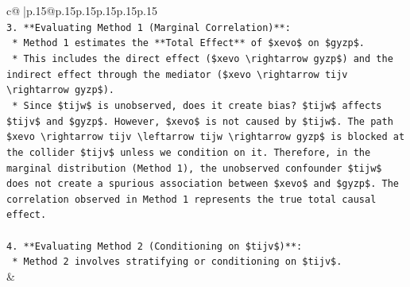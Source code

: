 \documentclass{article}
\begin{document}
{\begin{supertabular}{c@{$\;$}|p{.15\linewidth}@{}p{.15\linewidth}p{.15\linewidth}p{.15\linewidth}p{.15\linewidth}p{.15\linewidth}}
{{{\\ 
\texttt{3.  **Evaluating Method 1 (Marginal Correlation)**:} \\
\texttt{    *   Method 1 estimates the **Total Effect** of \$xevo\$ on \$gyzp\$.} \\
\texttt{    *   This includes the direct effect (\$xevo \textbackslash{}rightarrow gyzp\$) and the indirect effect through the mediator (\$xevo \textbackslash{}rightarrow tijv \textbackslash{}rightarrow gyzp\$).} \\
\texttt{    *   Since \$tijw\$ is unobserved, does it create bias? \$tijw\$ affects \$tijv\$ and \$gyzp\$. However, \$xevo\$ is not caused by \$tijw\$. The path \$xevo \textbackslash{}rightarrow tijv \textbackslash{}leftarrow tijw \textbackslash{}rightarrow gyzp\$ is blocked at the collider \$tijv\$ unless we condition on it. Therefore, in the marginal distribution (Method 1), the unobserved confounder \$tijw\$ does not create a spurious association between \$xevo\$ and \$gyzp\$. The correlation observed in Method 1 represents the true total causal effect.} \\
\\ 
\texttt{4.  **Evaluating Method 2 (Conditioning on \$tijv\$)**:} \\
\texttt{    *   Method 2 involves stratifying or conditioning on \$tijv\$.} \\
            }
        }
    }
    & \\ \\


\end{supertabular}}
\end{document}
